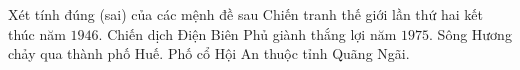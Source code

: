 \begin{ex}
Xét tính đúng (sai) của các mệnh đề sau
\choiceTF
{Chiến tranh thế giới lần thứ hai kết thúc năm $1946$.}
{Chiến dịch Điện Biên Phủ giành thắng lợi năm $1975$.}
{\True Sông Hương chảy qua thành phố Huế.}
{Phố cổ Hội An thuộc tỉnh Quãng Ngãi.}
\end{ex}
